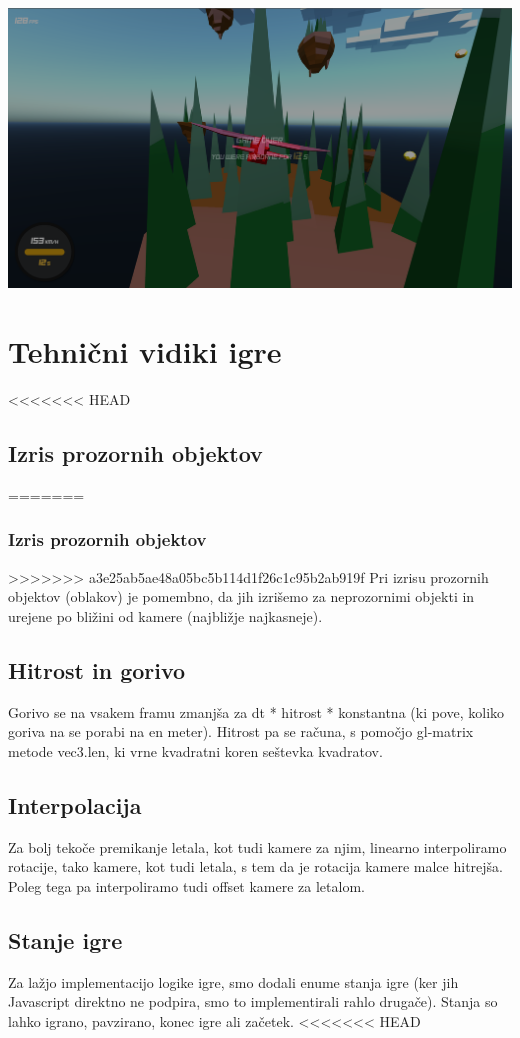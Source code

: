 \documentclass[a4paper]{article}
\begin{document}
\begin{center}
     \includegraphics[width=\columnwidth]{game over.jpg}
\end{center}

\section{Tehnični vidiki igre} %
<<<<<<< HEAD
\subsection{Izris prozornih objektov}%
=======
\subsubsection{Izris prozornih objektov}%
>>>>>>> a3e25ab5ae48a05bc5b114d1f26c1c95b2ab919f
Pri izrisu prozornih objektov (oblakov) je pomembno, da jih izrišemo za neprozornimi objekti in urejene po bližini od kamere (najbližje najkasneje).
\subsection{Hitrost in gorivo}%
Gorivo se na vsakem framu zmanjša za dt * hitrost * konstantna (ki pove, koliko goriva na se porabi na en meter). Hitrost pa se računa, s pomočjo gl-matrix metode vec3.len, ki vrne kvadratni koren seštevka kvadratov.
\subsection{Interpolacija}%
Za bolj tekoče premikanje letala, kot tudi kamere za njim, linearno interpoliramo rotacije, tako kamere, kot tudi letala, s tem da je rotacija kamere malce hitrejša. Poleg tega pa interpoliramo tudi offset kamere za letalom. 
\subsection{Stanje igre}%
Za lažjo implementacijo logike igre, smo dodali enume stanja igre (ker jih Javascript direktno ne podpira, smo to implementirali rahlo drugače). Stanja so lahko igrano, pavzirano, konec igre ali začetek. 
<<<<<<< HEAD
\end{document}
